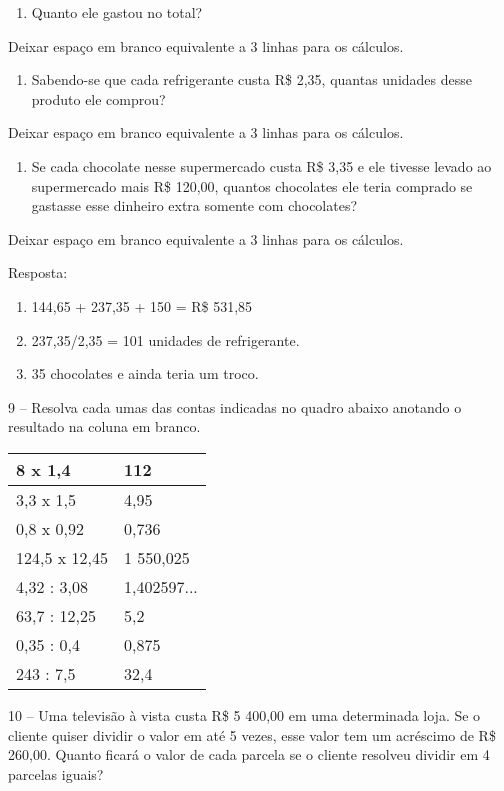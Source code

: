 \begin{enumerate}
\def\labelenumi{\alph{enumi})}
\item
  Quanto ele gastou no total?
\end{enumerate}

Deixar espaço em branco equivalente a 3 linhas para os cálculos.

\begin{enumerate}
\def\labelenumi{\alph{enumi})}
\item
  Sabendo-se que cada refrigerante custa R\$ 2,35, quantas unidades
  desse produto ele comprou?
\end{enumerate}

Deixar espaço em branco equivalente a 3 linhas para os cálculos.

\begin{enumerate}
\def\labelenumi{\alph{enumi})}
\item
  Se cada chocolate nesse supermercado custa R\$ 3,35 e ele tivesse
  levado ao supermercado mais R\$ 120,00, quantos chocolates ele teria
  comprado se gastasse esse dinheiro extra somente com chocolates?
\end{enumerate}

Deixar espaço em branco equivalente a 3 linhas para os cálculos.

Resposta:

\begin{enumerate}
\def\labelenumi{\alph{enumi})}
\item
  144,65 + 237,35 + 150 = R\$ 531,85
\item
  237,35/2,35 = 101 unidades de refrigerante.
\item
  35 chocolates e ainda teria um troco.
\end{enumerate}

9 -- Resolva cada umas das contas indicadas no quadro abaixo anotando o
resultado na coluna em branco.

\begin{longtable}[]{@{}ll@{}}
\toprule
8 x 1,4 & 112\tabularnewline
\midrule
\endhead
3,3 x 1,5 & 4,95\tabularnewline
0,8 x 0,92 & 0,736\tabularnewline
124,5 x 12,45 & 1 550,025\tabularnewline
4,32 : 3,08 & 1,402597...\tabularnewline
63,7 : 12,25 & 5,2\tabularnewline
0,35 : 0,4 & 0,875\tabularnewline
243 : 7,5 & 32,4\tabularnewline
\bottomrule
\end{longtable}

10 -- Uma televisão à vista custa R\$ 5 400,00 em uma determinada loja.
Se o cliente quiser dividir o valor em até 5 vezes, esse valor tem um
acréscimo de R\$ 260,00. Quanto ficará o valor de cada parcela se o
cliente resolveu dividir em 4 parcelas iguais?


